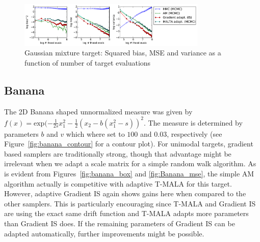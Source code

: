 \begin{figure}[tbp]
\begin{center}
\includegraphics[width=0.8\textwidth]{figures/Gauss_Grid_b2_mse_var.pdf}
\caption{Gaussian mixture target: Squared bias, MSE and variance as a function of number of target evaluations}
\label{fig:gauss_grid_mse}
\end{center}
\end{figure}

\subsection{Banana}
The 2D Banana shaped unnormalized measure was given by $f(x) = \textrm{exp}(-\frac{1}{2s}x_1^2-\frac{1}{2}(x_2-b(x_1^2-s))^2$. The measure is determined by parameters $b$ and $v$ which where set to $100$ and $0.03$, respectively (see Figure~\ref{fig:banana_contour} for a contour plot). For unimodal targets, gradient based samplers are traditionally strong, though that advantage might be irrelevant when we adapt a scale matrix for a simple random walk algorithm. As is evident from Figures~\ref{fig:banana_box} and \ref{fig:Banana_mse}, the simple AM algorithm actually is competitive with adaptive T-MALA for this target. However, adaptive Gradient IS again shows gains here when compared to the other samplers. This is particularly encouraging since  T-MALA and Gradient IS are using the exact same drift function and T-MALA adapts more parameters than Gradient IS does. If the remaining parameters of Gradient IS can be adapted automatically, further improvements might be possible.


